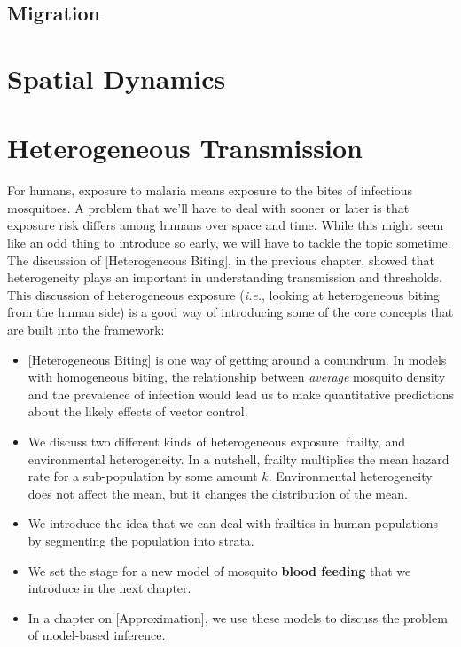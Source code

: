 \documentclass[
]{book}
\begin{document}
\section{Migration}\label{migration}

\chapter{Spatial Dynamics}\label{spatial-dynamics-1}

\chapter{Heterogeneous Transmission}\label{heterogeneous-transmission}

For humans, exposure to malaria means exposure to the bites of infectious mosquitoes. A problem that we'll have to deal with sooner or later is that exposure risk differs among humans over space and time. While this might seem like an odd thing to introduce so early, we will have to tackle the topic sometime. The discussion of {[}Heterogeneous Biting{]}, in the previous chapter, showed that heterogeneity plays an important in understanding transmission and thresholds. This discussion of heterogeneous exposure (\emph{i.e.}, looking at heterogeneous biting from the human side) is a good way of introducing some of the core concepts that are built into the framework:

\begin{itemize}
\item
  {[}Heterogeneous Biting{]} is one way of getting around a conundrum. In models with homogeneous biting, the relationship between \emph{average} mosquito density and the prevalence of infection would lead us to make quantitative predictions about the likely effects of vector control.
\item
  We discuss two different kinds of heterogeneous exposure: frailty, and environmental heterogeneity. In a nutshell, frailty multiplies the mean hazard rate for a sub-population by some amount \(k\). Environmental heterogeneity does not affect the mean, but it changes the distribution of the mean.
\item
  We introduce the idea that we can deal with frailties in human populations by segmenting the population into strata.
\item
  We set the stage for a new model of mosquito \textbf{blood feeding} that we introduce in the next chapter.
\item
  In a chapter on {[}Approximation{]}, we use these models to discuss the problem of model-based inference.
\end{itemize}
\end{document}
